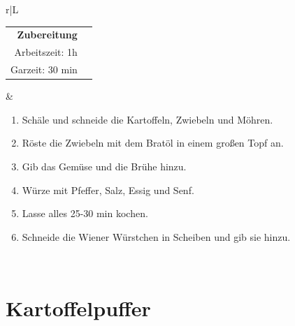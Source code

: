 \documentclass[a4paper, 12pt]{scrbook} 								%
\numberwithin{equation}{section} 									%
\begin{document}
			\newpage
			\begin{tabularx}{\textwidth}{r|L}						
									
			\begin{tabular}[t]{rr}
				\textbf{Zubereitung}	\\
				Arbeitszeit: 1h	\\
				Garzeit: 30 min	\\
			\end{tabular}			&	\begin{enumerate}[]
											\item Schäle und schneide die Kartoffeln, Zwiebeln und Möhren.
											\item Röste die Zwiebeln mit dem Bratöl in einem großen Topf an.
											\item Gib das Gemüse und die Brühe hinzu.
											\item Würze mit Pfeffer, Salz, Essig und Senf.
											\item Lasse alles 25-30 min kochen.
											\item Schneide die Wiener Würstchen in Scheiben und gib sie hinzu.
										\end{enumerate}	\\
		\end{tabularx}
		\newpage


		\section{Kartoffelpuffer}	\label{kartoffelpuffer}
\end{document}
